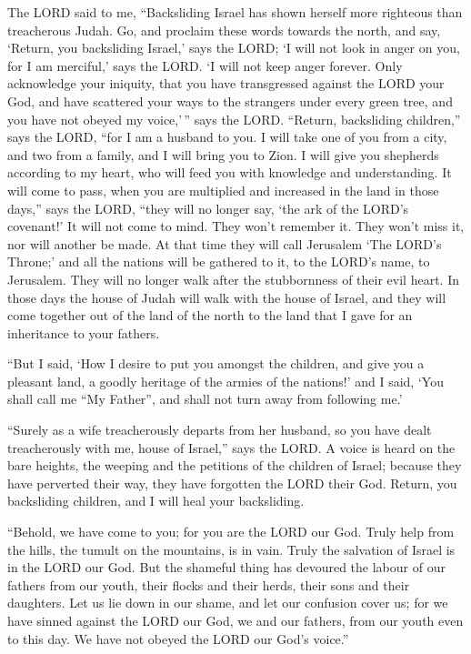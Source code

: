  The LORD said to me, ``Backsliding Israel has shown
herself more righteous than treacherous Judah.  Go, and
proclaim these words towards the north, and say, `Return, you
backsliding Israel,' says the LORD; `I will not look in anger on you,
for I am merciful,' says the LORD. `I will not keep anger forever.
 Only acknowledge your iniquity, that you have
transgressed against the LORD your God, and have scattered your ways to
the strangers under every green tree, and you have not obeyed my
voice,'\,'' says the LORD.  ``Return, backsliding
children,'' says the LORD, ``for I am a husband to you. I will take one
of you from a city, and two from a family, and I will bring you to Zion.
 I will give you shepherds according to my heart, who
will feed you with knowledge and understanding.  It will
come to pass, when you are multiplied and increased in the land in those
days,'' says the LORD, ``they will no longer say, `the ark of the LORD's
covenant!' It will not come to mind. They won't remember it. They won't
miss it, nor will another be made.  At that time they
will call Jerusalem `The LORD's Throne;' and all the nations will be
gathered to it, to the LORD's name, to Jerusalem. They will no longer
walk after the stubbornness of their evil heart.  In
those days the house of Judah will walk with the house of Israel, and
they will come together out of the land of the north to the land that I
gave for an inheritance to your fathers.

 ``But I said, `How I desire to put you amongst the
children, and give you a pleasant land, a goodly heritage of the armies
of the nations!' and I said, `You shall call me ``My Father'', and shall
not turn away from following me.'

 ``Surely as a wife treacherously departs from her
husband, so you have dealt treacherously with me, house of Israel,''
says the LORD.  A voice is heard on the bare heights, the
weeping and the petitions of the children of Israel; because they have
perverted their way, they have forgotten the LORD their God.
 Return, you backsliding children, and I will heal your
backsliding.

``Behold, we have come to you; for you are the LORD our God.
 Truly help from the hills, the tumult on the mountains,
is in vain. Truly the salvation of Israel is in the LORD our God.
 But the shameful thing has devoured the labour of our
fathers from our youth, their flocks and their herds, their sons and
their daughters.  Let us lie down in our shame, and let
our confusion cover us; for we have sinned against the LORD our God, we
and our fathers, from our youth even to this day. We have not obeyed the
LORD our God's voice.''

